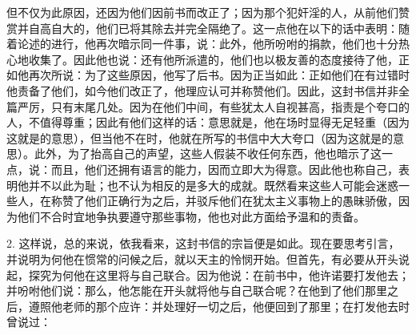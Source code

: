 但不仅为此原因，还因为他们因前书而改正了；因为那个犯奸淫的人，从前他们赞赏并自高自大的，他们已将其除去并完全隔绝了。这一点他在以下的话中表明：随着论述的进行，他再次暗示同一件事，说：此外，他所吩咐的捐款，他们也十分热心地收集了。因此他也说：还有他所派遣的，他们也以极友善的态度接待了他，正如他再次所说：为了这些原因，他写了后书。因为正当如此：正如他们在有过错时他责备了他们，如今他们改正了，他理应认可并称赞他们。因此，这封书信并非全篇严厉，只有末尾几处。因为在他们中间，有些犹太人自视甚高，指责是个夸口的人，不值得尊重；因此有他们这样的话：意思就是，他在场时显得无足轻重（因为这就是的意思），但当他不在时，他就在所写的书信中大大夸口（因为这就是的意思）。此外，为了抬高自己的声望，这些人假装不收任何东西，他也暗示了这一点，说：而且，他们还拥有语言的能力，因而立即大为得意。因此他也称自己，表明他并不以此为耻；也不认为相反的是多大的成就。既然看来这些人可能会迷惑一些人，在称赞了他们正确行为之后，并驳斥他们在犹太主义事物上的愚昧骄傲，因为他们不合时宜地争执要遵守那些事物，他也对此方面给予温和的责备。\par

2. 这样说，总的来说，依我看来，这封书信的宗旨便是如此。现在要思考引言，并说明为何他在惯常的问候之后，就以天主的怜悯开始。但首先，有必要从开头说起，探究为何他在这里将与自己联合。因为他说：在前书中，他许诺要打发他去；并吩咐他们说：那么，他怎能在开头就将他与自己联合呢？在他到了他们那里之后，遵照他老师的那个应许：并处理好一切之后，他便回到了那里；在打发他去时曾说过：\par

